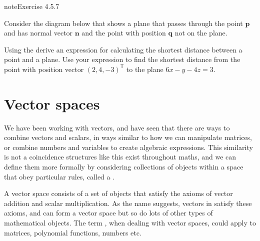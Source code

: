 \documentclass[letterpaper,10pt,english]{jupyterBook}
\let\sphinxpxdimen\pdfpxdimen\else\newdimen\sphinxpxdimen
\begin{document}
\begin{sphinxadmonition}{note}{Exercise 4.5.7}



\sphinxAtStartPar
Consider the diagram below that shows a plane that passes through the point \(\mathbf{p}\) and has normal vector \(\mathbf{n}\) and the point with position \(\mathbf{q}\) not on the plane.

\begin{figure}[htbp]
\centering

\noindent\sphinxincludegraphics[width=350\sphinxpxdimen]{{4_point_plane_distance}.svg}
\end{figure}

\sphinxAtStartPar
Using the {\hyperref[\detokenize{_pages/3.3_Dot_and_cross_products:dot-product-definition}]{}} derive an expression for calculating the shortest distance between a point and a plane. Use your expression to find the shortest distance from the point with position vector \((2, 4, -3)^\mathsf{T}\) to the plane \(6x - y - 4z = 3\).
\end{sphinxadmonition}

\sphinxstepscope

\ignorespaces 

\chapter{Vector spaces}
\label{\detokenize{_pages/5.0_Vector_spaces:vector-spaces}}\label{\detokenize{_pages/5.0_Vector_spaces:index-0}}\label{\detokenize{_pages/5.0_Vector_spaces:vector-spaces-chapter}}\label{\detokenize{_pages/5.0_Vector_spaces::doc}}
\sphinxAtStartPar
We have been working with vectors, and have seen that there are ways to combine vectors and scalars, in ways similar to how we can manipulate matrices, or combine numbers and variables to create algebraic expressions. This similarity is not a coincidence \sphinxhyphen{} structures like this exist throughout maths, and we can define them more formally by considering collections of objects within a space that obey particular rules, called a .

\sphinxAtStartPar
A vector space consists of a set of objects that satisfy the axioms of vector addition and scalar multiplication. As the name suggests, vectors in {\hyperref[\detokenize{_pages/3.0_Vectors:euclidean-space-section}]{}} satisfy these axioms, and can form a vector space \sphinxhyphen{} but so do lots of other types of mathematical objects. The term , when dealing with vector spaces, could apply to matrices, polynomial functions, numbers etc.
\end{document}
